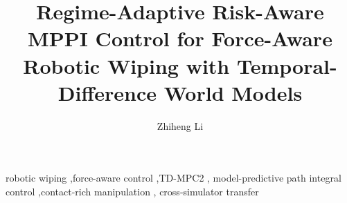 \documentclass[final,5p,times,twocolumn]{elsarticle}
\begin{document}
\begin{frontmatter}

\title{Regime-Adaptive Risk-Aware MPPI Control for Force-Aware Robotic Wiping with Temporal-Difference World Models}

\author[addr1]{Zhiheng Li}
\address[addr1]{Independent Researcher, Shanghai, China}



\begin{keyword}
robotic wiping \sep force-aware control \sep TD-MPC2 \sep
model-predictive path integral control \sep contact-rich manipulation \sep
cross-simulator transfer
\end{keyword}

\end{frontmatter}


















\end{document}
